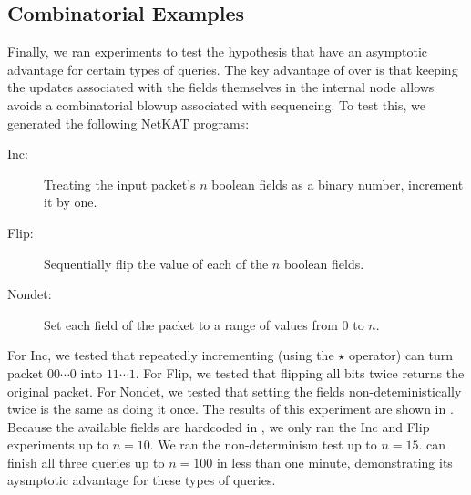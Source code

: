 \documentclass[acmsmall,dvipsnames,nonacm]{acmart}
\begin{document}
\subsection{Combinatorial Examples}

Finally, we ran experiments to test the hypothesis that \SPPs{} have
an asymptotic advantage for certain types of queries.  The key
advantage of \SPPs{} over \FDDs{} is that keeping the updates
associated with the fields themselves in the internal node allows
avoids a combinatorial blowup associated with sequencing. To test
this, we generated the following NetKAT programs:
\begin{description}
    \item[Inc:] Treating the input packet's $n$ boolean fields as a binary number, increment it by one.
    \item[Flip:] Sequentially flip the value of each of the $n$ boolean fields.
    \item[Nondet:] Set each field of the packet to a range of values from $0$ to $n$.
\end{description}
For Inc, we tested that repeatedly incrementing (using the $\star$
operator) can turn packet $00\cdots0$ into $11\cdots1$.  For Flip, we
tested that flipping all bits twice returns the original packet.  For
Nondet, we tested that setting the fields non-deteministically twice
is the same as doing it once.  The results of this experiment are
shown in .  Because the available fields are
hardcoded in \Frenetic, we only ran the Inc and Flip experiments up to
$n=10$. We ran the non-determinism test up to $n=15$.  \KATch{} can
finish all three queries up to $n=100$ in less than one minute,
demonstrating its aysmptotic advantage for these types of queries.
\end{document}
